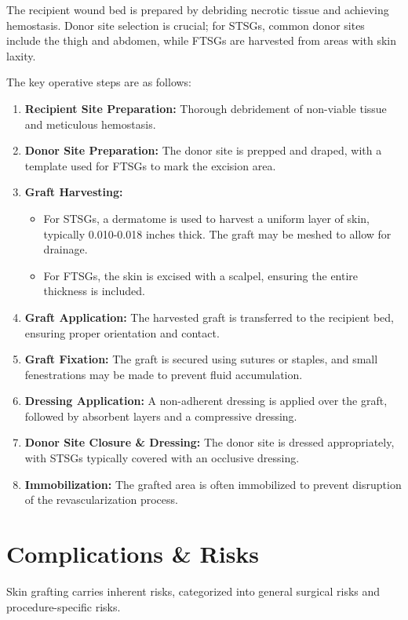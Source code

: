 The recipient wound bed is prepared by debriding necrotic tissue and achieving hemostasis. Donor site selection is crucial; for STSGs, common donor sites include the thigh and abdomen, while FTSGs are harvested from areas with skin laxity.

The key operative steps are as follows:

\begin{enumerate}
  \item \textbf{Recipient Site Preparation:} Thorough debridement of non-viable tissue and meticulous hemostasis.
  
  \item \textbf{Donor Site Preparation:} The donor site is prepped and draped, with a template used for FTSGs to mark the excision area.
  
  \item \textbf{Graft Harvesting:}
      \begin{itemize}
        \item For STSGs, a dermatome is used to harvest a uniform layer of skin, typically 0.010-0.018 inches thick. The graft may be meshed to allow for drainage.
        \item For FTSGs, the skin is excised with a scalpel, ensuring the entire thickness is included.
      \end{itemize}
  
  \item \textbf{Graft Application:} The harvested graft is transferred to the recipient bed, ensuring proper orientation and contact.
  
  \item \textbf{Graft Fixation:} The graft is secured using sutures or staples, and small fenestrations may be made to prevent fluid accumulation.
  
  \item \textbf{Dressing Application:} A non-adherent dressing is applied over the graft, followed by absorbent layers and a compressive dressing.
  
  \item \textbf{Donor Site Closure \& Dressing:} The donor site is dressed appropriately, with STSGs typically covered with an occlusive dressing.
  
  \item \textbf{Immobilization:} The grafted area is often immobilized to prevent disruption of the revascularization process.
\end{enumerate}

\section*{Complications \& Risks}
Skin grafting carries inherent risks, categorized into general surgical risks and procedure-specific risks.

